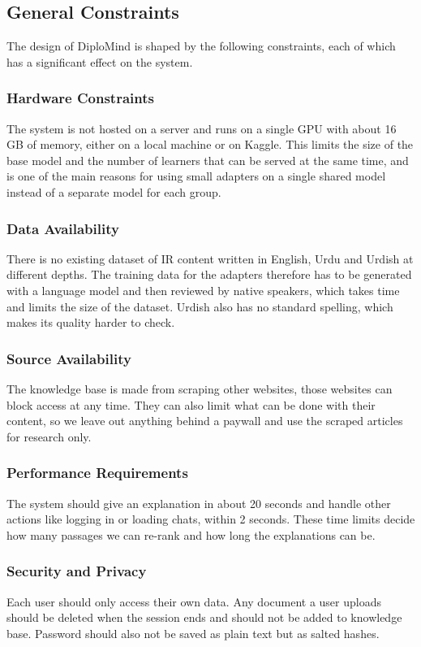 \documentclass{FastFyp}
\begin{document}
\subsection{General Constraints}
The design of DiploMind is shaped by the following constraints, each of which has a significant effect on the system.
 
\subsubsection{Hardware Constraints}
The system is not hosted on a server and runs on a single GPU with about 16 GB of memory, either on a local machine or on Kaggle. This limits the size of the base model and the number of learners that can be served at the same time, and is one of the main reasons for using small adapters on a single shared model instead of a separate model for each group.
 
\subsubsection{Data Availability}
There is no existing dataset of IR content written in English, Urdu and Urdish at different depths. The training data for the adapters therefore has to be generated with a language model and then reviewed by native speakers, which takes time and limits the size of the dataset. Urdish also has no standard spelling, which makes its quality harder to check.
 
\subsubsection{Source Availability}
The knowledge base is made from scraping other websites, those websites can block access at any time. They can also limit what can be done with their content, so we leave out anything behind a paywall and use the scraped articles for research only.
 
\subsubsection{Performance Requirements}
The system should give an explanation in about 20 seconds and handle other actions like logging in or loading chats, within 2 seconds. These time limits decide how many passages we can re-rank and how long the explanations can be.
 
\subsubsection{Security and Privacy}
Each user should only access their own data. Any document a user uploads should be deleted when the session ends and should not be added to knowledge base. Password should also not be saved as plain text but as salted hashes.
 
\end{document}
